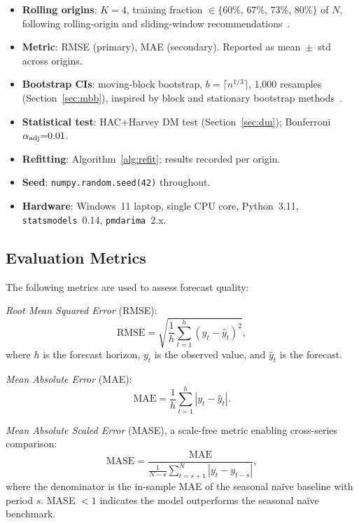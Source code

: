 \documentclass[sn-mathphys-num,pdflatex]{sn-jnl}
\begin{document}
\begin{itemize}
\item \textbf{Rolling origins}: $K{=}4$, training fraction
$\in\{60\%,\,67\%,\,73\%,\,80\%\}$ of $N$, following
rolling-origin and sliding-window recommendations~\cite{tashman2000oos, bergmeir2012cv, hewamalage2023pitfalls}.
\item \textbf{Metric}: RMSE (primary), MAE (secondary).
Reported as mean~$\pm$~std across origins.
\item \textbf{Bootstrap CIs}: moving-block bootstrap,
$b{=}\lceil n^{1/3}\rceil$, 1{,}000 resamples (Section~\ref{sec:mbb}),
inspired by block and stationary bootstrap methods~\cite{kunsch1989, politis1994stationary}.
\item \textbf{Statistical test}: HAC+Harvey DM test
(Section~\ref{sec:dm}); Bonferroni $\alpha_{\rm adj}{=}0.01$.
\item \textbf{Refitting}: Algorithm~\ref{alg:refit};
results recorded per origin.
\item \textbf{Seed}: \texttt{numpy.random.seed(42)} throughout.
\item \textbf{Hardware}: Windows~11 laptop, single CPU core,
Python~3.11, \texttt{statsmodels}~0.14, \texttt{pmdarima}~2.x.
\end{itemize}

\subsection{Evaluation Metrics}
\label{sec:metrics}

The following metrics are used to assess forecast quality:

\textit{Root Mean Squared Error} (RMSE):
\begin{equation}
  \text{RMSE} = \sqrt{\frac{1}{h}\sum_{t=1}^{h}(y_t - \hat{y}_t)^2},
  \label{eq:rmse}
\end{equation}
where $h$ is the forecast horizon, $y_t$ is the observed value, and $\hat{y}_t$ is the forecast.

\textit{Mean Absolute Error} (MAE):
\begin{equation}
  \text{MAE} = \frac{1}{h}\sum_{t=1}^{h}|y_t - \hat{y}_t|.
  \label{eq:mae}
\end{equation}

\textit{Mean Absolute Scaled Error} (MASE), a scale-free metric enabling
cross-series comparison:
\begin{equation}
  \text{MASE} = \frac{\text{MAE}}{\frac{1}{N-s}\sum_{t=s+1}^{N}|y_t - y_{t-s}|},
  \label{eq:mase}
\end{equation}
where the denominator is the in-sample MAE of the seasonal na\"{i}ve
baseline with period $s$.  MASE $< 1$ indicates the model outperforms
the seasonal na\"{i}ve benchmark.
\end{document}
